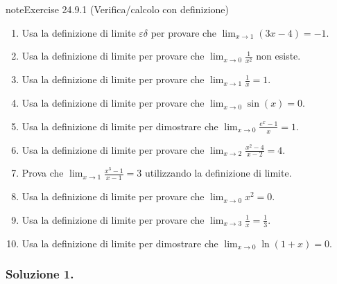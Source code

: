 \documentclass[letterpaper,10pt,italian]{jupyterBook}
\begin{document}
\begin{sphinxadmonition}{note}{Exercise 24.9.1 (Verifica/calcolo con definizione)}


\begin{enumerate}
%
\item {} 
\sphinxAtStartPar
Usa la definizione di limite \(\varepsilon\)\sphinxhyphen{}\(\delta\) per provare che \(\lim_{x \to 1} (3x - 4) = -1\).

\item {} 
\sphinxAtStartPar
Usa la definizione di limite per provare che \(\lim_{x \to 0} \frac{1}{x^2}\) non esiste.

\item {} 
\sphinxAtStartPar
Usa la definizione di limite per provare che \(\lim_{x \to 1} \frac{1}{x} = 1\).

\item {} 
\sphinxAtStartPar
Usa la definizione di limite per provare che \(\lim_{x \to 0} \sin(x) = 0\).

\item {} 
\sphinxAtStartPar
Usa la definizione di limite per dimostrare che \(\lim_{x \to 0} \frac{e^x - 1}{x} = 1\).

\item {} 
\sphinxAtStartPar
Usa la definizione di limite per provare che \(\lim_{x \to 2} \frac{x^2 - 4}{x - 2} = 4\).

\item {} 
\sphinxAtStartPar
Prova che \(\lim_{x \to 1} \frac{x^3 - 1}{x - 1} = 3\) utilizzando la definizione di limite.

\item {} 
\sphinxAtStartPar
Usa la definizione di limite per provare che \(\lim_{x \to 0} x^2 = 0\).

\item {} 
\sphinxAtStartPar
Usa la definizione di limite per provare che \(\lim_{x \to 3} \frac{1}{x} = \frac{1}{3}\).

\item {} 
\sphinxAtStartPar
Usa la definizione di limite per dimostrare che \(\lim_{x \to 0} \ln(1+x) = 0\).

\end{enumerate}
\end{sphinxadmonition}
\subsubsection*{Soluzione 1.}
\end{document}
